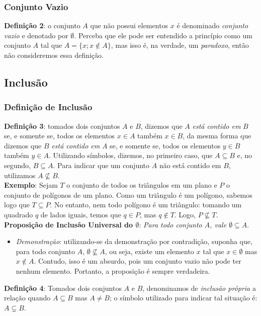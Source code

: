 \documentclass[13pt,letterpaper]{article}
\begin{document}
\subsubsection{Conjunto Vazio}
\textbf{Definição 2}: o conjunto $A$ que não possui elementos $x$ é denominado \emph{conjunto vazio} e denotado por $\emptyset$. Perceba que ele pode ser entendido a princípio como um conjunto $A$ tal que $A = \{x; x \notin A\}$, mas isso é, na verdade, um \emph{paradoxo}, então não consideremos essa definição.

\subsection{Inclusão}
\subsubsection{Definição de Inclusão}
\textbf{Definição 3}: tomados dois conjuntos $A$ e $B$, dizemos que $A$ \emph{está contido em} $B$ se, e somente se, todos os elementos $x \in A$ também $x \in B$, da mesma forma que dizemos que $B$ \emph{está contido em} $A$ se, e somente se, todos os elementos $y \in B$ também $y \in A$. Utilizando símbolos, dizemos, no primeiro caso, que $A \subseteq B$ e, no segundo, $B \subseteq A$. Para indicar que um conjunto $A$ não está contido em $B$, utilizamos $ A \nsubseteq B$. \\
\textbf{Exemplo}: Sejam $T$ o conjunto de todos os triângulos em um plano e $P$ o conjunto de polígonos de um plano. Como um triângulo é um polígono, sabemos logo que $T \subseteq P$. No entanto, nem todo polígono é um triângulo: tomando um quadrado $q$ de lados iguais, temos que $q \in P$, mas $q \notin T$. Logo, $P \nsubseteq T$. \\
\textbf{Proposição de Inclusão Universal do $\emptyset$}: \emph{Para todo conjunto $A$, vale $\emptyset \subseteq A$}.
\begin{itemize}
    \item \emph{Demonstração}: utilizando-se da demonstração por contradição, suponha que, para todo conjunto $A$, $\emptyset \nsubseteq A$, ou seja, existe um elemento $x$ tal que $x \in \emptyset$ mas $x \notin A$. Contudo, isso é um absurdo, pois um conjunto vazio não pode ter nenhum elemento. Portanto, a proposição é sempre verdadeira.
\end{itemize}
\textbf{Definição 4}: Tomados dois conjuntos $A$ e $B$, denominamos de \emph{inclusão própria} a relação quando $A \subseteq B$ mas $A \ne B$; o símbolo utilizado para indicar tal situação é: $A \subsetneq B$. \\
\end{document}
